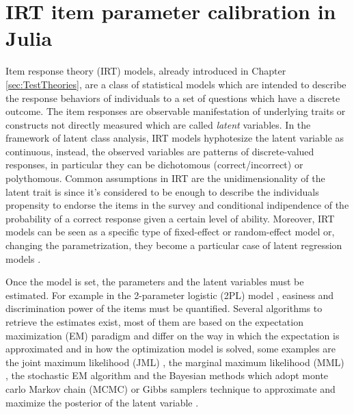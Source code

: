 \label{key}%

\chapter{IRT item parameter calibration in Julia} %
\label{ch:Julia}

Item response theory (IRT) models, already introduced in Chapter \ref{sec:TestTheories}, are a class of statistical models which are intended to describe the response behaviors of individuals to a set of questions which have a discrete outcome. The item responses are observable manifestation of underlying traits or constructs not directly measured which are called \emph{latent} variables. In the framework of latent class analysis, IRT models hyphotesize the latent variable as continuous, instead, the observed variables are patterns of discrete-valued responses, in particular they can be dichotomous (correct/incorrect) or polythomous. Common assumptions in IRT are the unidimensionality of the latent trait is  since it's considered to be enough to describe the individuals propensity to endorse the items in the survey and conditional indipendence of the probability of a correct response given a certain level of ability. Moreover, IRT models can be seen as a specific type of fixed-effect or random-effect model \parencite{fox2006fixed} or, changing the parametrization, they become a particular case of latent regression models \parencite{von2010stochastic}. 

Once the model is set, the parameters and the latent variables must be estimated. For example in the 2-parameter logistic (2PL) model \parencite{BockMislevy1982}, easiness and discrimination power of the items must be quantified. Several algorithms to retrieve the estimates exist, most of them are based on the expectation maximization (EM) paradigm and differ on the way in which the expectation is approximated and in how the optimization model is solved, some examples are the joint maximum likelihood (JML) \parencite{lord1968statistical}, the marginal maximum likelihood (MML) \parencite{drasgow1989evaluation}, the stochastic EM algorithm \parencite{fox2003stochastic} and the Bayesian methods which adopt monte carlo Markov chain (MCMC) or Gibbs samplers technique to approximate and maximize the posterior of the latent variable \parencite{matteucci2012prior}. 

